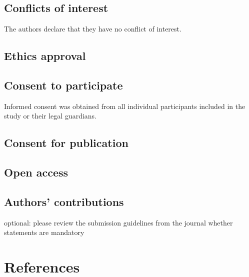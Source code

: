 \documentclass[
  english,
  man,floatsintext]{apa6}
\begin{document}
\hypertarget{conflicts-of-interest}{%
\subsection{Conflicts of interest}\label{conflicts-of-interest}}

The authors declare that they have no conflict of interest.

\hypertarget{ethics-approval}{%
\subsection{Ethics approval}\label{ethics-approval}}

\hypertarget{consent-to-participate}{%
\subsection{Consent to participate}\label{consent-to-participate}}

Informed consent was obtained from all individual participants included in the study or their legal guardians.

\hypertarget{consent-for-publication}{%
\subsection{Consent for publication}\label{consent-for-publication}}

\hypertarget{open-access}{%
\subsection{Open access}\label{open-access}}

\hypertarget{authors-contributions}{%
\subsection{Authors' contributions}\label{authors-contributions}}

optional: please review the submission guidelines from the journal whether statements are mandatory

\newpage

\hypertarget{references}{%
\section{References}\label{references}}

\begingroup
\setlength{\parindent}{-0.5in}
\setlength{\leftskip}{0.5in}
\end{document}
